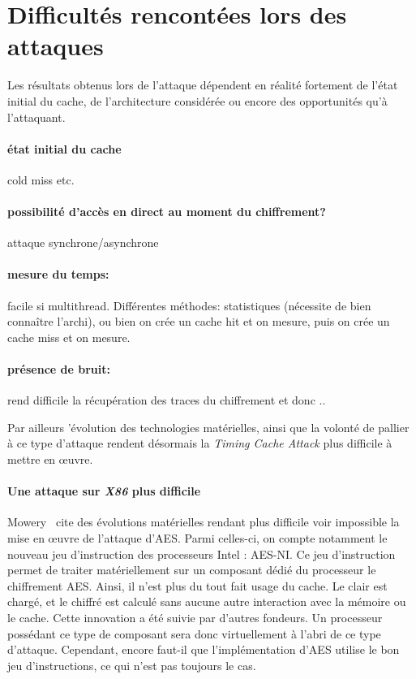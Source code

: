 \documentclass[a4paper,11pt]{article}
\begin{document}
\section{Difficultés rencontées lors des attaques} %

Les résultats obtenus lors de l'attaque dépendent en réalité fortement de l'état initial du cache, de l'architecture considérée ou encore des opportunités qu'à l'attaquant.

\paragraph{état initial du cache} cold miss etc.~\cite{canteaut2006understanding}

\paragraph{possibilité d'accès en direct au moment du chiffrement?} attaque synchrone/asynchrone~\cite{osvik2006cache} %

\paragraph{mesure du temps:} facile si multithread. Différentes méthodes: statistiques (nécessite de bien connaître l'archi), ou bien on crée un cache hit et on mesure, puis on crée un cache miss et on mesure. %

\paragraph{présence de bruit:} rend difficile la récupération des traces du chiffrement et donc .. %

Par ailleurs 'évolution des technologies matérielles, ainsi que la volonté de pallier à ce type d'attaque rendent désormais la \emph{Timing Cache Attack} plus difficile à mettre en \oe uvre.

\paragraph{Une attaque sur \emph{X86} plus difficile} %
Mowery~\cite{mowery2012aes} cite des évolutions matérielles rendant plus difficile voir impossible la mise en œuvre de l'attaque d'AES. Parmi celles-ci, on compte notamment le nouveau jeu d'instruction des processeurs Intel : AES-NI. Ce jeu d'instruction permet de traiter matériellement sur un composant dédié du processeur le chiffrement AES. Ainsi, il n'est plus du tout fait usage du cache. Le clair est chargé, et le chiffré est calculé sans aucune autre interaction avec la mémoire ou le cache.
Cette innovation a été suivie par d'autres fondeurs. Un processeur possédant ce type de composant sera donc virtuellement à l'abri de ce type d'attaque. Cependant, encore faut-il que l'implémentation d'AES utilise le bon jeu d'instructions, ce qui n'est pas toujours le cas.
\end{document}
